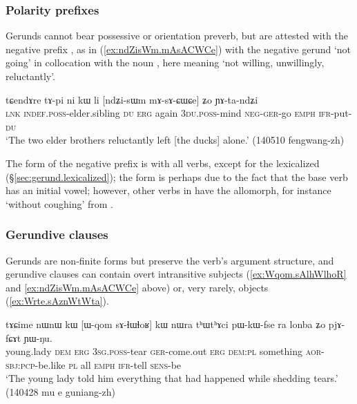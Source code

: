 \subsubsection{Polarity prefixes} \label{sec:gerund.neg}
Gerunds cannot bear possessive or orientation preverb, but are attested with the negative prefix , as in (\ref{ex:ndZisWm.mAsACWCe}) with the negative gerund  `not going' in collocation with the noun , here meaning `not willing, unwillingly, reluctantly'.

\begin{exe}
\ex \label{ex:ndZisWm.mAsACWCe}
\gll tɕendɤre tɤ-pi ni kɯ li [ndʑi-sɯm mɤ-sɤ-ɕɯ\redp{}ɕe] ʑo ɲɤ-ta-ndʑi \\
\textsc{lnk} \textsc{indef}.\textsc{poss}-elder.sibling \textsc{du} \textsc{erg} again \textsc{3du}.\textsc{poss}-mind \textsc{neg}-\textsc{ger}-go \textsc{emph} \textsc{ifr}-put-\textsc{du} \\
\glt `The two elder brothers reluctantly left [the ducks] alone.' (140510 fengwang-zh)
\end{exe}

The form of the negative prefix is  with all verbs, except for the lexicalized  (§\ref{sec:gerund.lexicalized}); the form  is perhaps due to the fact that the base verb  has an initial  vowel; however, other verbs in  have the  allomorph, for instance  `without coughing' from .

 
\subsubsection{Gerundive clauses}  \label{sec:gerund.clauses}
Gerunds are non-finite forms but preserve the verb's argument structure, and gerundive clauses can contain overt intransitive subjects (\ref{ex:Wqom.sAlhWlhoR} and \ref{ex:ndZisWm.mAsACWCe} above) or, very rarely, objects (\ref{ex:Wrte.sAznWtWta}).

\begin{exe}
\ex \label{ex:Wqom.sAlhWlhoR}
\gll tɤɕime nɯnɯ kɯ [ɯ-qom sɤ-ɬɯ\redp{}ɬoʁ] kɯ nɯra tʰɯtʰɤci pɯ-kɯ-fse ra lonba ʑo pjɤ-fɕɤt ɲɯ-ŋu. \\
young.lady \textsc{dem} \textsc{erg} \textsc{3sg}.\textsc{poss}-tear \textsc{ger}-come.out \textsc{erg} \textsc{dem}:\textsc{pl} something \textsc{aor}-\textsc{sbj}:\textsc{pcp}-be.like \textsc{pl} all \textsc{emph} \textsc{ifr}-tell \textsc{sens}-be \\
\glt `The young lady told him everything that had happened while shedding tears.' (140428 mu e guniang-zh)
\end{exe}

